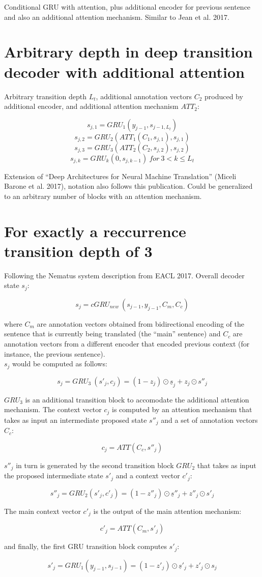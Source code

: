 \documentclass{article}
\begin{document}
\setlength{\parindent}{0pt}

\noindent Conditional GRU with attention, plus additional encoder for previous sentence and also an additional attention mechanism. Similar to Jean et al. 2017.

\section{Arbitrary depth in deep transition decoder with additional attention}

Arbitrary transition depth $L_t$, additional annotation vectors $C_2$ produced by additional encoder, and additional attention mechanism $ATT_2$:

\[ s_{j,1} = GRU_1 (y_{j -1}, s_{j - 1,L_t}) \]
\[ s_{j,2} = GRU_2 (ATT_1(C_1, s_{j,1}), s_{j,1})\]
\[ s_{j,3} = GRU_3 (ATT_2(C_2, s_{j,2}), s_{j,2})\]
\[ s_{j,k} = GRU_k (0, s_{j,k-1})\ for\ 3 < k\leq L_t\]

Extension of ``Deep Architectures for Neural Machine Translation'' (Miceli Barone et al. 2017), notation also follows this publication. Could be generalized to an arbitrary number of blocks with an attention mechanism.

\section{For exactly a reccurrence transition depth of 3}

Following the Nematus system description from EACL 2017. Overall decoder state $s_j$:

\[ s_j = cGRU_{new}\ (s_{j - 1}, y_{j - 1}, C_m, C_c) \]

where $C_m$ are annotation vectors obtained from bidirectional encoding of the sentence that is currently being translated (the ``main'' sentence) and $C_c$ are annotation vectors from a different encoder that encoded previous context (for instance, the previous sentence). \\

$s_j$ would be computed as follows:

\[ s_j = GRU_3\ (s'_j,c_j) = (1 - z_j) \odot \underline{s}_j + z_j \odot s''_j\]

$GRU_3$ is an additional transition block to accomodate the additional attention mechanism. The context vector $c_j$ is computed by an attention mechanism that takes as input an intermediate proposed state $s''_j$ and a set of annotation vectors $C_c$:

\[ c_j = ATT(C_c, s''_j)\]

$s''_j$ in turn is generated by the second transition block $GRU_2$ that takes as input the proposed intermediate state $s'_j$ and a context vector $c'_j$:

\[ s''_j = GRU_2(s'_j, c'_j) = (1 - z''_j) \odot \underline{s}''_j + z''_j \odot s'_j\]

The main context vector $c'_j$  is the output of the main attention mechanism:

\[ c'_j = ATT(C_m, s'_j)\]

and finally, the first GRU transition block computes $s'_j$:

\[ s'_j = GRU_1 (y_{j - 1}, s_{j - 1}) = (1 - z'_j) \odot \underline{s}'_j + z'_j \odot s_j\]
\end{document}

